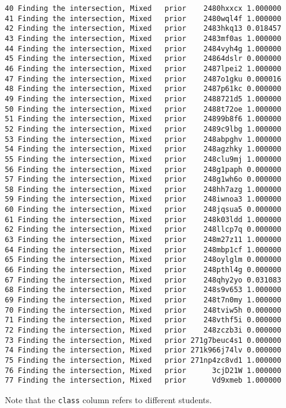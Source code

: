 \documentclass{article}
\begin{document}
\begin{verbatim}
40 Finding the intersection, Mixed   prior    2480hxxcx 1.000000
41 Finding the intersection, Mixed   prior    2480wql4f 1.000000
42 Finding the intersection, Mixed   prior    2483hkq13 0.018457
43 Finding the intersection, Mixed   prior    2483mf0as 1.000000
44 Finding the intersection, Mixed   prior    2484vyh4g 1.000000
45 Finding the intersection, Mixed   prior    24864dslr 0.000000
46 Finding the intersection, Mixed   prior    2487lpei2 1.000000
47 Finding the intersection, Mixed   prior    2487o1gku 0.000016
48 Finding the intersection, Mixed   prior    2487p61kc 0.000000
49 Finding the intersection, Mixed   prior    2488721d5 1.000000
50 Finding the intersection, Mixed   prior    2488t72oe 1.000000
51 Finding the intersection, Mixed   prior    24899b8f6 1.000000
52 Finding the intersection, Mixed   prior    2489c9lbg 1.000000
53 Finding the intersection, Mixed   prior    248abpghv 1.000000
54 Finding the intersection, Mixed   prior    248agzhky 1.000000
55 Finding the intersection, Mixed   prior    248clu9mj 1.000000
56 Finding the intersection, Mixed   prior    248g1paph 0.000000
57 Finding the intersection, Mixed   prior    248g1wh6o 0.000000
58 Finding the intersection, Mixed   prior    248hh7azg 1.000000
59 Finding the intersection, Mixed   prior    248iwnoa3 1.000000
60 Finding the intersection, Mixed   prior    248jqsua5 0.000000
61 Finding the intersection, Mixed   prior    248k03ldd 1.000000
62 Finding the intersection, Mixed   prior    248llcp7q 0.000000
63 Finding the intersection, Mixed   prior    248m27z11 1.000000
64 Finding the intersection, Mixed   prior    248mbp1cf 1.000000
65 Finding the intersection, Mixed   prior    248oylglm 0.000000
66 Finding the intersection, Mixed   prior    248pthl4g 0.000000
67 Finding the intersection, Mixed   prior    248qhy2yo 0.031083
68 Finding the intersection, Mixed   prior    248s9v653 1.000000
69 Finding the intersection, Mixed   prior    248t7n0my 1.000000
70 Finding the intersection, Mixed   prior    248tviw5h 0.000000
71 Finding the intersection, Mixed   prior    248vthf5i 0.000000
72 Finding the intersection, Mixed   prior    248zczb3i 0.000000
73 Finding the intersection, Mixed   prior 271g7beuc4s1 0.000000
74 Finding the intersection, Mixed   prior 271k966j74lv 0.000000
75 Finding the intersection, Mixed   prior 271np4zc8vd1 1.000000
76 Finding the intersection, Mixed   prior      3cjD21W 1.000000
77 Finding the intersection, Mixed   prior      Vd9xmeb 1.000000
\end{verbatim}
    
Note that the \texttt{class} column refers to different students.
\end{document}
